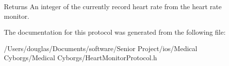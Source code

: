 \begin{DoxyReturn}{Returns}
An integer of the currently record heart rate from the heart rate monitor. 
\end{DoxyReturn}


The documentation for this protocol was generated from the following file\-:\begin{DoxyCompactItemize}
\item 
/\-Users/douglas/\-Documents/software/\-Senior Project/ios/\-Medical Cyborgs/\-Medical Cyborgs/Heart\-Monitor\-Protocol.\-h\end{DoxyCompactItemize}
